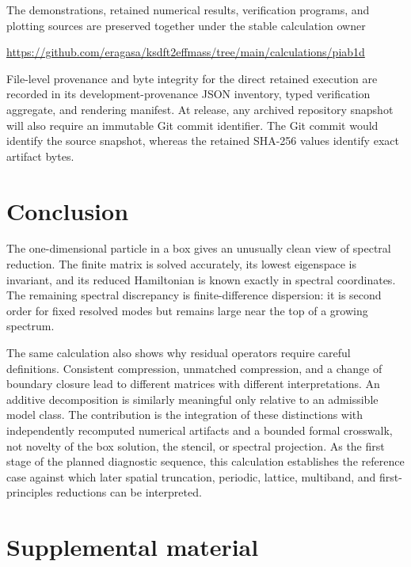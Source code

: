 \documentclass[11pt]{article}
\begin{document}
The demonstrations, retained numerical results, verification programs, and plotting
sources are preserved together under the stable calculation owner
\begin{center}
\url{https://github.com/eragasa/ksdft2effmass/tree/main/calculations/piab1d}
\end{center}
File-level provenance and byte integrity for the direct retained execution are recorded
in its development-provenance JSON inventory, typed verification aggregate, and
rendering manifest. At release, any archived repository snapshot will also require an
immutable Git commit identifier. The Git commit would identify the source snapshot,
whereas the retained SHA-256 values identify exact artifact bytes.

\section{Conclusion}

The one-dimensional particle in a box gives an unusually clean view of spectral
reduction. The finite matrix is solved accurately, its lowest eigenspace is invariant,
and its reduced Hamiltonian is known exactly in spectral coordinates. The remaining
spectral discrepancy is finite-difference dispersion: it is second order for fixed
resolved modes but remains large near the top of a growing spectrum.

The same calculation also shows why residual operators require careful definitions.
Consistent compression, unmatched compression, and a change of boundary closure lead
to different matrices with different interpretations. An additive decomposition is
similarly meaningful only relative to an admissible model class. The contribution is
the integration of these distinctions with independently recomputed numerical
artifacts and a bounded formal crosswalk, not novelty of the box solution, the stencil,
or spectral projection. As the first stage of the planned diagnostic sequence, this
calculation establishes the reference case against which later spatial truncation,
periodic, lattice, multiband, and first-principles reductions can be interpreted.




\clearpage
\appendix
\section*{Supplemental material}
\end{document}
